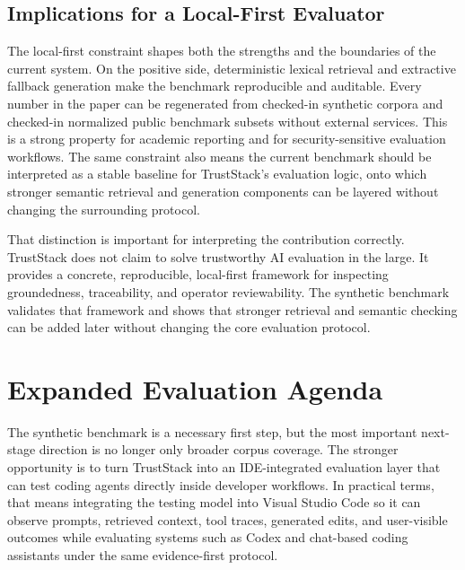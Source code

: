 \documentclass[conference]{IEEEtran}
\newcommand{\TrustSection}[1]{\section{\texorpdfstring{\textcolor{TrustStackBlue}{#1}}{#1}}}
\newcommand{\TrustSubsection}[1]{\subsection{\texorpdfstring{\textcolor{TrustStackTeal}{#1}}{#1}}}
\begin{document}
\TrustSubsection{Implications for a Local-First Evaluator}
The local-first constraint shapes both the strengths and the boundaries of the current system. On the positive side, deterministic lexical retrieval and extractive fallback generation make the benchmark reproducible and auditable. Every number in the paper can be regenerated from checked-in synthetic corpora and checked-in normalized public benchmark subsets without external services. This is a strong property for academic reporting and for security-sensitive evaluation workflows. The same constraint also means the current benchmark should be interpreted as a stable baseline for TrustStack's evaluation logic, onto which stronger semantic retrieval and generation components can be layered without changing the surrounding protocol.

That distinction is important for interpreting the contribution correctly. TrustStack does not claim to solve trustworthy AI evaluation in the large. It provides a concrete, reproducible, local-first framework for inspecting groundedness, traceability, and operator reviewability. The synthetic benchmark validates that framework and shows that stronger retrieval and semantic checking can be added later without changing the core evaluation protocol.

\TrustSection{Expanded Evaluation Agenda}
The synthetic benchmark is a necessary first step, but the most important next-stage direction is no longer only broader corpus coverage. The stronger opportunity is to turn TrustStack into an IDE-integrated evaluation layer that can test coding agents directly inside developer workflows. In practical terms, that means integrating the testing model into Visual Studio Code so it can observe prompts, retrieved context, tool traces, generated edits, and user-visible outcomes while evaluating systems such as Codex and chat-based coding assistants under the same evidence-first protocol.
\end{document}
